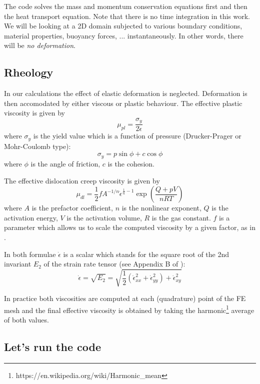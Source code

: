 The code solves the mass and momentum conservation equations first and then the heat transport equation. 
Note that there is no time integration in this work. We will be looking at a 2D domain subjected to various boundary 
conditions, material properties, buoyancy forces, ... instantaneously. In other words, there will be {\it no deformation}.



\subsection*{Rheology}

In our calculations the effect of elastic deformation is neglected. Deformation is then accomodated by either viscous 
or plastic behaviour. The effective plastic viscosity is given by \cite{thie11,nabu15,spmw16}
\[
\mu_{pl} = \frac{\sigma_y}{2 \dot{\epsilon}}
\]
where $\sigma_y$ is the yield value which is a function of pressure (Drucker-Prager or Mohr-Coulomb type):
\[
\sigma_y = p \sin \phi + c \cos \phi
\]
where $\phi$ is the angle of friction, $c$ is the cohesion. 

The effective dislocation creep viscosity is given by \cite{thie11}
\[
\mu_{dl}=\frac{1}{2} f A^{-1/n} \dot{\epsilon}^{\frac{1}{n}-1} \exp \left( \frac{Q+pV}{nRT}  \right)
\]
where $A$ is the prefactor coefficient, $n$ is the nonlinear exponent, $Q$ is the activation energy, $V$ is 
the activation volume, $R$ is the gas constant. $f$ is a parameter which allows us to scale the computed 
viscosity by a given factor, as in \cite{hube11}.

In both formulae $\dot{\epsilon}$ is a scalar which stands for the square root of the 2nd invariant $E_2$ 
of the strain rate tensor (see Appendix B of \cite{thie11}):
\[
\dot{\epsilon}=\sqrt{E_2} = \sqrt{ \frac{1}{2}(\dot{\epsilon}_{xx}^2+\dot{\epsilon}_{yy}^2)+\dot{\epsilon}_{xy}^2 }
\]

In practice both viscosities are computed at each (quadrature) point of the FE mesh and the final effective viscosity 
is obtained by taking the harmonic\footnote{https://en.wikipedia.org/wiki/Harmonic\_mean} average of both values.

\subsection*{Let's run the code}

